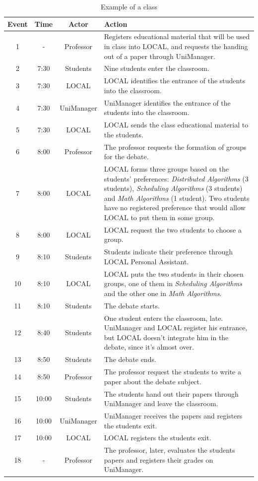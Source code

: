 \documentclass{svjour3}                     %
\begin{document}
\begin{table}\centering\footnotesize
    \begin{tabular*}{1\textwidth}{@{}cccp{6.8cm}@{}}
    \toprule
    Event & Time & Actor & Action \\
    \midrule
    1 & - & Professor & Registers educational material that will be used in
class into LOCAL, and requests the handing out of a paper through UniManager. \\
    2 & 7:30 & Students & Nine students enter the classroom. \\
    3 & 7:30 & LOCAL & LOCAL identifies the entrance of the students into the classroom. \\
    4 & 7:30 & UniManager & UniManager identifies the entrance of the students into the classroom. \\
    5 & 7:30 & LOCAL & LOCAL sends the class educational material to the students. \\
    6 & 8:00 & Professor & The professor requests the formation of groups for the debate. \\
    7 & 8:00 & LOCAL & LOCAL forms three groups based on the students' preferences: {\em Distributed Algorithms} (3 students), {\em Scheduling Algorithms} (3 students) and {\em Math Algorithms} (1 student). Two students have no registered preference that would allow LOCAL to put them in some group. \\
    8 & 8:00 & LOCAL & LOCAL request the two students to choose a group. \\
    9 & 8:10 & Students & Students indicate their preference through LOCAL Personal Assistant. \\
    10 & 8:10 & LOCAL & LOCAL puts the two students in their chosen groups, one of them in {\em Scheduling Algorithms} and the other one in {\em Math Algorithms}. \\
    11 & 8:10 & Students & The debate starts. \\
    12 & 8:40 & Students & One student enters the classroom, late. UniManager and LOCAL register his entrance, but LOCAL doesn't integrate him in the debate, since it's almost over.\\
    13 & 8:50 & Students & The debate ends. \\
    14 & 8:50 & Professor & The professor request the students to write a paper about the debate subject.\\
    15 & 10:00 & Students & The students hand out their papers through UniManager and leave the classroom.\\
    16 & 10:00 & UniManager & UniManager receives the papers and registers the students exit.\\
    17 & 10:00 & LOCAL & LOCAL registers the students exit.\\
    18 & - & Professor & The professor, later, evaluates the students papers and registers their grades on UniManager.\\
    \bottomrule
  \end{tabular*}
  \caption{Example of a class}
  \label{tab:aula}
\end{table}
\end{document}
